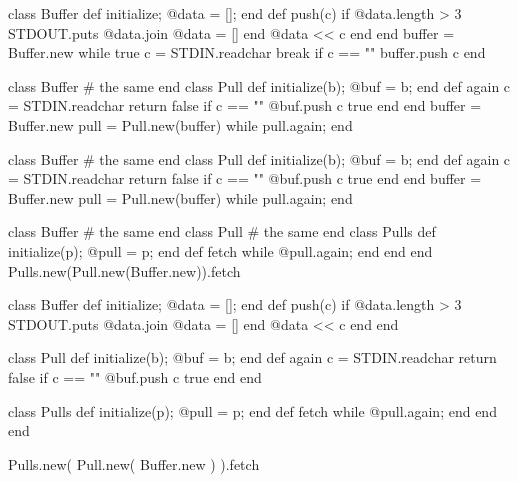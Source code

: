 \documentclass{article}
\begin{document}
\begin{pptWide}{2}
{\scriptsize\begin{ffcode}
class Buffer
  def initialize; @data = []; end
  def push(c)
    if @data.length > 3
      STDOUT.puts @data.join
      @data = []
    end
    @data << c
  end
end
buffer = Buffer.new
while true
  c = STDIN.readchar
  break if c == "\n"
  buffer.push c
end
\end{ffcode}
}
\par\columnbreak\par
{\scriptsize\begin{ffcode}
class Buffer
  # the same
end
class Pull
  def initialize(b); @buf = b; end
  def again
    c = STDIN.readchar
    return false if c == "\n"
    @buf.push c
    true
  end
end
buffer = Buffer.new
pull = Pull.new(buffer)
while pull.again; end
\end{ffcode}
}
\end{pptWide}
\plush{}

\begin{pptWide}{2}
{\scriptsize\begin{ffcode}
class Buffer
  # the same
end
class Pull
  def initialize(b); @buf = b; end
  def again
    c = STDIN.readchar
    return false if c == "\n"
    @buf.push c
    true
  end
end
buffer = Buffer.new
pull = Pull.new(buffer)
while pull.again; end
\end{ffcode}
}
\par\columnbreak\par
{\scriptsize\begin{ffcode}
class Buffer
  # the same
end
class Pull
  # the same
end
class Pulls
  def initialize(p); @pull = p; end
  def fetch
    while @pull.again; end
  end
end
Pulls.new(Pull.new(Buffer.new)).fetch
\end{ffcode}
}
\end{pptWide}
\plush{}

\begin{pptWide}{2}
{\scriptsize\begin{ffcode}
class Buffer
  def initialize; @data = []; end
  def push(c)
    if @data.length > 3
      STDOUT.puts @data.join
      @data = []
    end
    @data << c
  end
end

class Pull
  def initialize(b); @buf = b; end
  def again
    c = STDIN.readchar
    return false if c == "\n"
    @buf.push c
    true
  end
end

class Pulls
  def initialize(p); @pull = p; end
  def fetch
    while @pull.again; end
  end
end

Pulls.new(
  Pull.new(
    Buffer.new
  )
).fetch
\end{ffcode}
}
\end{pptWide}
\plush{}
\end{document}
